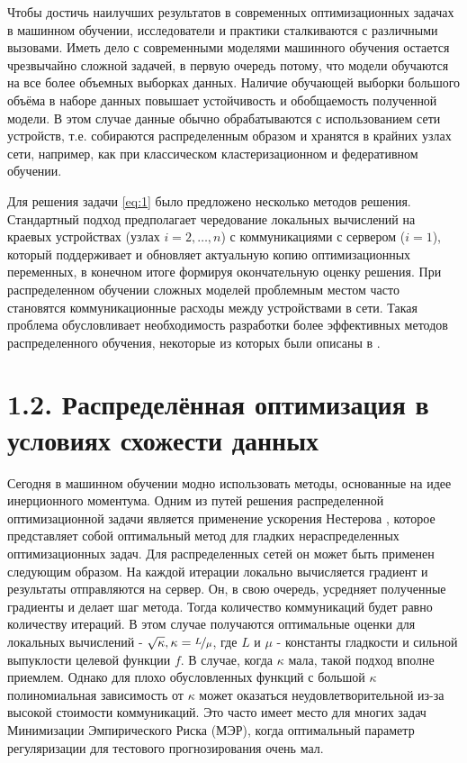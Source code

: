 \documentclass{article}
\theoremstyle{definition}
\theoremstyle{plain}
\begin{document}
Чтобы достичь наилучших результатов в современных оптимизационных задачах в машинном обучении, исследователи и практики сталкиваются с различными вызовами. Иметь дело с современными моделями машинного обучения остается чрезвычайно сложной задачей, в первую очередь потому, что модели обучаются на все более объемных выборках данных. Наличие обучающей выборки большого объёма в наборе данных повышает устойчивость и обобщаемость полученной модели. В этом случае данные обычно обрабатываются с использованием сети устройств, т.е. собираются распределенным образом и хранятся в крайних узлах сети, например, как при классическом кластеризационном \cite{verbraeken2020survey} и федеративном \cite{konevcny2016federated, li2020federated, kairouz2021advances} обучении.

Для решения задачи \eqref{eq:1} было предложено несколько методов решения. Стандартный подход предполагает чередование локальных вычислений на краевых устройствах (узлах $i = 2, \ldots, n$) с коммуникациями с сервером ($i = 1$), который поддерживает и обновляет актуальную копию оптимизационных переменных, в конечном итоге формируя окончательную оценку решения. При распределенном обучении сложных моделей проблемным местом часто становятся коммуникационные расходы между устройствами в сети. Такая проблема обусловливает необходимость разработки более эффективных методов распределенного обучения, некоторые из которых были описаны в \cite{konevcny2016federated, ghosh2020communication, smith2018cocoa, gorbunov2021marina}.

\section*{1.2. Распределённая оптимизация в условиях схожести данных}

Сегодня в машинном обучении модно использовать методы, основанные на идее инерционного моментума. Одним из путей решения распределенной оптимизационной задачи является применение ускорения Нестерова \cite{nesterov2018lectures}, которое представляет собой оптимальный метод для гладких нераспределенных оптимизационных задач. Для распределенных сетей он может быть применен следующим образом. На каждой итерации  локально вычисляется градиент и результаты отправляются на сервер. Он, в свою очередь, усредняет полученные градиенты и делает шаг метода. Тогда количество коммуникаций будет равно количеству итераций. В этом случае  получаются оптимальные оценки для локальных вычислений - $\sqrt{\kappa}, \kappa = \nicefrac{L}{\mu}$, где $L$ и $\mu$ - константы гладкости и сильной выпуклости целевой функции $f$. В случае, когда $\kappa$ мала, такой подход вполне приемлем. Однако для плохо обусловленных функций с большой $\kappa$ полиномиальная зависимость от $\kappa$ может оказаться неудовлетворительной из-за высокой стоимости коммуникаций. Это часто имеет место для многих задач Минимизации Эмпирического Риска (МЭР), когда оптимальный параметр регуляризации для тестового прогнозирования очень мал.
\end{document}
